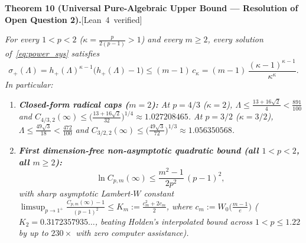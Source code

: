 \documentclass[10pt,letterpaper]{article}
\newcommand{\leanbadge}[1]{\mbox{\sffamily\scriptsize\color{leanborder}[#1]}}
\begin{document}
\begin{tcolorbox}[mathbox]
\textbf{Theorem 10 (Universal Pure-Algebraic Upper Bound — Resolution of Open Question 2).}\hfill\leanbadge{Lean~4 verified}\par\vspace{1.5pt}
\emph{For every $1 < p < 2$ ($\kappa = \frac{p}{2(p-1)} > 1$) and every $m \ge 2$, every solution of~\eqref{eq:power_sys} satisfies}
\begin{equation}\label{eq:univ_alg_cap}
  \sigma_+(\Lambda) = h_+(\Lambda)^{\kappa - 1}\bigl(h_+(\Lambda) - 1\bigr) \le (m - 1)\,c_\kappa = (m - 1)\,\frac{(\kappa - 1)^{\kappa - 1}}{\kappa^\kappa}.
\end{equation}
\emph{In particular:}
\begin{enumerate}[label=(\alph*),leftmargin=1.8em,itemsep=2pt,topsep=2pt]
  \item \emph{\textbf{Closed-form radical caps ($m = 2$):} At $p = 4/3$ ($\kappa = 2$), $\Lambda \le \frac{13 + 16\sqrt{2}}{4} < \frac{891}{100}$ and $C_{4/3,2}(\infty) \le \bigl(\frac{13+16\sqrt{2}}{32}\bigr)^{1/4} \approx 1.027208465$. At $p = 3/2$ ($\kappa = 3/2$), $\Lambda \le \frac{49\sqrt{3}}{18} < \frac{472}{100}$ and $C_{3/2,2}(\infty) \le \bigl(\frac{49\sqrt{3}}{72}\bigr)^{1/3} \approx 1.056350568$.}
  \item \emph{\textbf{First dimension-free non-asymptotic quadratic bound (all $1<p<2$, all $m\ge 2$):}}
  \[
    \ln C_{p,m}(\infty) \le \frac{m^2 - 1}{2p^2}\,(p - 1)^2,
  \]
  \emph{with sharp asymptotic Lambert-$W$ constant $\limsup_{p\to 1^+}\frac{C_{p,m}(\infty) - 1}{(p-1)^2} \le K_m := \frac{c_m^2 + 2 c_m}{2}$, where $c_m := W_0\bigl(\frac{m-1}{e}\bigr)$ ($K_2 = 0.3172357935\dots$, beating Holden's interpolated bound across $1 < p \le 1.22$ by up to $230\times$ with zero computer assistance).}
\end{enumerate}
\end{tcolorbox}
\end{document}

